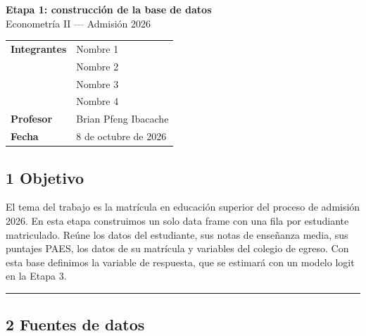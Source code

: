 \documentclass[11pt,letterpaper]{article}
\begin{document}
\sloppy

\begin{center}
  {\LARGE \textbf{Etapa 1: construcción de la base de datos}}\\[4pt]
  {\large Econometría II --- Admisión 2026}
\end{center}
\vspace{0.5em}

\begin{center}
\begin{tabular}{ll}
\toprule
\textbf{Integrantes} & Nombre 1 \\
                     & Nombre 2 \\
                     & Nombre 3 \\
                     & Nombre 4 \\
\midrule
\textbf{Profesor}    & Brian Pfeng Ibacache \\
\textbf{Fecha}       & 8 de octubre de 2026 \\
\bottomrule
\end{tabular}
\end{center}

\bigskip

\subsection*{1 \; Objetivo}

El tema del trabajo es la matrícula en educación superior del proceso de
admisión 2026. En esta etapa construimos un solo data frame con una fila
por estudiante matriculado. Reúne los datos del estudiante, sus notas de
enseñanza media, sus puntajes PAES, los datos de su matrícula y variables
del colegio de egreso. Con esta base definimos la variable de respuesta,
que se estimará con un modelo logit en la Etapa 3.

\medskip\hrule\medskip

\subsection*{2 \; Fuentes de datos}
\end{document}
